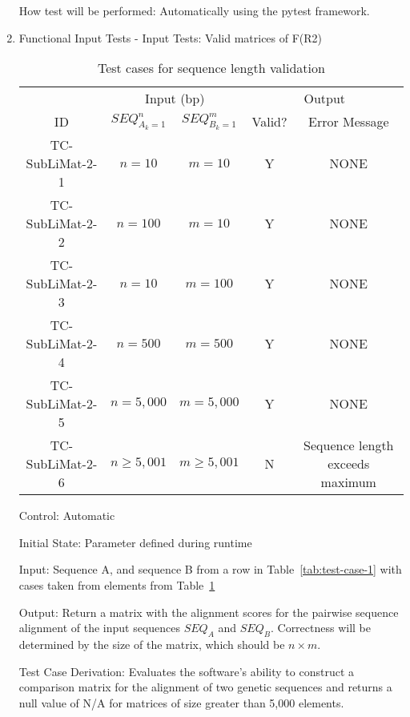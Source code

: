 \documentclass[12pt, titlepage]{article}
\begin{document}
\begin{enumerate}

How test will be performed: Automatically using the pytest framework.
					


\item{Functional Input Tests - Input Tests: Valid matrices of F(R2)\\}
\begin{table}[h]
  \begin{tabular}{|c|c c|c c|}
  \hline 
    & \multicolumn{2}{c|}{Input (bp)} & \multicolumn{2}{c|}{Output} \\
  \cline{2-5}
  ID & $SEQ_{A_k=1}^n$ & $SEQ_{B_k=1}^m$ & Valid? & Error Message \\
  \hline
  TC-SubLiMat-2-1 & $n=10$ & $m=10$ & Y & NONE \\
  \hline
  TC-SubLiMat-2-2 & $n=100$ & $m=10$ & Y & NONE \\
  \hline
  TC-SubLiMat-2-3 & $n=10$ & $m=100$ & Y & NONE \\
  \hline
  TC-SubLiMat-2-4 & $n=500$ & $m=500$ & Y & NONE \\
  \hline
  TC-SubLiMat-2-5 & $n=5,000$ & $m=5,000$ & Y & NONE \\
  \hline
  TC-SubLiMat-2-6 & $n \geq 5,001$ & $m \geq 5,001$ & N & Sequence length exceeds maximum \\
  \hline
  \end{tabular}
  \caption{Test cases for sequence length validation}
  \label{tab:test-case-2}
 \end{table}

Control: Automatic
					
Initial State: Parameter defined during runtime
					
Input: Sequence A, and sequence B from a row in Table~\ref{tab:test-case-1} with cases taken from elements from 
Table~\ref{tab:test-case-2}

					
Output: Return a matrix with the alignment scores for the pairwise sequence alignment of the input sequences
 $SEQ_A$ and $SEQ_B$. Correctness will be determined by the size of the matrix, which should be $n \times m$.

Test Case Derivation: Evaluates the software's ability to construct a comparison matrix for the alignment of 
two genetic sequences and returns a null value of N/A for matrices of size greater than 5,000 elements.


\end{enumerate}
\end{document}

